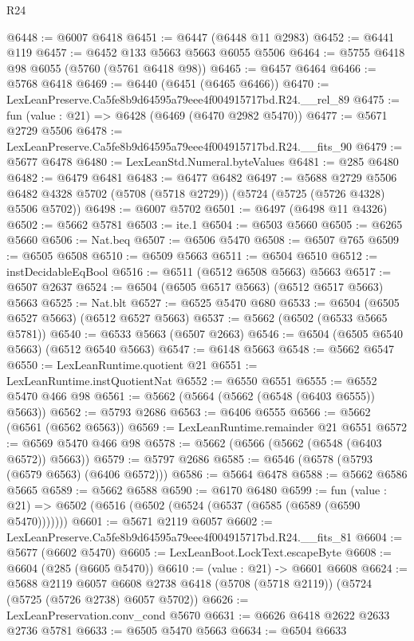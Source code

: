 \begin{lexlean}{R24}
\begin{coremodule}
@6448 := @6007 @6418
@6451 := @6447 (@6448 @11 @2983)
@6452 := @6441 @119
@6457 := @6452 @133 @5663 @5663 @6055 @5506
@6464 := @5755 @6418 @98 @6055 (@5760 (@5761 @6418 @98))
@6465 := @6457 @6464
@6466 := @5768 @6418
@6469 := @6440 (@6451 (@6465 @6466))
@6470 := LexLeanPreserve.Ca5fe8b9d64595a79eee4f004915717bd.R24.__rel_89
@6475 := fun (value : @21) => @6428 (@6469 (@6470 @2982 @5470))
@6477 := @5671 @2729 @5506
@6478 := LexLeanPreserve.Ca5fe8b9d64595a79eee4f004915717bd.R24.__fits_90
@6479 := @5677 @6478
@6480 := LexLeanStd.Numeral.byteValues
@6481 := @285 @6480
@6482 := @6479 @6481
@6483 := @6477 @6482
@6497 := @5688
    @2729
    @5506
    @6482
    @4328
    @5702
    (@5708 (@5718 @2729))
    (@5724 (@5725 (@5726 @4328) @5506 @5702))
@6498 := @6007 @5702
@6501 := @6497 (@6498 @11 @4326)
@6502 := @5662 @5781
@6503 := ite.{1}
@6504 := @6503 @5660
@6505 := @6265 @5660
@6506 := Nat.beq
@6507 := @6506 @5470
@6508 := @6507 @765
@6509 := @6505 @6508
@6510 := @6509 @5663
@6511 := @6504 @6510
@6512 := instDecidableEqBool
@6516 := @6511 (@6512 @6508 @5663) @5663
@6517 := @6507 @2637
@6524 := @6504 (@6505 @6517 @5663) (@6512 @6517 @5663) @5663
@6525 := Nat.blt
@6527 := @6525 @5470 @680
@6533 := @6504 (@6505 @6527 @5663) (@6512 @6527 @5663)
@6537 := @5662 (@6502 (@6533 @5665 @5781))
@6540 := @6533 @5663 (@6507 @2663)
@6546 := @6504 (@6505 @6540 @5663) (@6512 @6540 @5663)
@6547 := @6148 @5663
@6548 := @5662 @6547
@6550 := LexLeanRuntime.quotient @21
@6551 := LexLeanRuntime.instQuotientNat
@6552 := @6550 @6551
@6555 := @6552 @5470 @466 @98
@6561 := @5662 (@5664 (@5662 (@6548 (@6403 @6555)) @5663))
@6562 := @5793 @2686
@6563 := @6406 @6555
@6566 := @5662 (@6561 (@6562 @6563))
@6569 := LexLeanRuntime.remainder @21 @6551
@6572 := @6569 @5470 @466 @98
@6578 := @5662 (@6566 (@5662 (@6548 (@6403 @6572)) @5663))
@6579 := @5797 @2686
@6585 := @6546 (@6578 (@5793 (@6579 @6563) (@6406 @6572)))
@6586 := @5664 @6478
@6588 := @5662 @6586 @5665
@6589 := @5662 @6588
@6590 := @6170 @6480
@6599 := fun (value : @21) => @6502 (@6516 (@6502 (@6524 (@6537 (@6585 (@6589 (@6590 @5470)))))))
@6601 := @5671 @2119 @6057
@6602 := LexLeanPreserve.Ca5fe8b9d64595a79eee4f004915717bd.R24.__fits_81
@6604 := @5677 (@6602 @5470)
@6605 := LexLeanBoot.LockText.escapeByte
@6608 := @6604 (@285 (@6605 @5470))
@6610 := (value : @21) -> @6601 @6608
@6624 := @5688
    @2119
    @6057
    @6608
    @2738
    @6418
    (@5708 (@5718 @2119))
    (@5724 (@5725 (@5726 @2738) @6057 @5702))
@6626 := LexLeanPreservation.conv_cond @5670
@6631 := @6626 @6418 @2622 @2633 @2736 @5781
@6633 := @6505 @5470 @5663
@6634 := @6504 @6633

\end{coremodule}
\end{lexlean}
